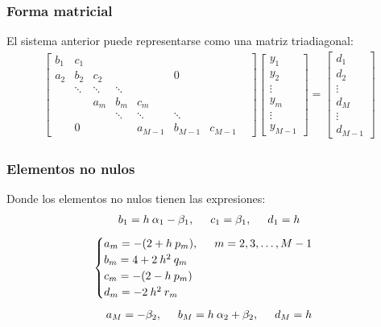 \begin{frame}
\frametitle{Forma matricial}
El sistema anterior puede representarse como una matriz triadiagonal:
\fontsize{12}{12}\selectfont
\begin{align}
\begin{bmatrix}
b_{1} & c_{1} & & & & & & \\
a_{2} & b_{2} & c_{2} & & & 0 & \\
 & \ddots & \ddots & \ddots & & & & \\
 & & a_{m} & b_{m} & c_{m} & & & \\
 & & & \ddots & \ddots & \ddots &  & \\
 & 0 & & & a_{M - 1} & b_{M - 1} & c_{M - 1}
\end{bmatrix}
\begin{bmatrix}
y_{1} \\
y_{2} \\
\vdots \\
y_{m} \\
\vdots \\
y_{M - 1}
\end{bmatrix}
=
\begin{bmatrix}
d_{1} \\
d_{2} \\
\vdots \\
d_{M} \\
\vdots \\
d_{M - 1}
\end{bmatrix}
\label{eq:ecuacion_12_103}
\end{align}
\end{frame}
\begin{frame}
\frametitle{Elementos no nulos}
Donde los elementos no nulos tienen las expresiones:
\begin{align*}
b_{1} = h \: \alpha_{1} - \beta_{1}, \hspace{0.5cm} c_{1} =  \beta_{1}, \hspace{0.5cm} d_{1} = h
\end{align*}
\begin{align*}
\begin{cases}
a_{m} = - (2 + h \: p_{m}), \hspace{0.5cm} m = 2, 3, \ldots, M - 1 \\
b_{m} = 4 + 2 \: h^{2} \: q_{m} \\
c_{m} = - (2 - h \: p_{m}) \\
d_{m} = - 2 \: h^{2} \: r_{m}
\end{cases}
\end{align*}
\begin{align*}
a_{M} = - \beta_{2}, \hspace{0.5cm} b_{M} = h \: \alpha_{2} + \beta_{2}, \hspace{0.5cm} d_{M} = h
\\
\label{eq:ecuacion_12_104}
\end{align*}
\end{frame}
